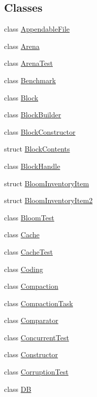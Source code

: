 \subsection*{Classes}
\begin{DoxyCompactItemize}
\item 
class \hyperlink{classleveldb_1_1_appendable_file}{Appendable\+File}
\item 
class \hyperlink{classleveldb_1_1_arena}{Arena}
\item 
class \hyperlink{classleveldb_1_1_arena_test}{Arena\+Test}
\item 
class \hyperlink{classleveldb_1_1_benchmark}{Benchmark}
\item 
class \hyperlink{classleveldb_1_1_block}{Block}
\item 
class \hyperlink{classleveldb_1_1_block_builder}{Block\+Builder}
\item 
class \hyperlink{classleveldb_1_1_block_constructor}{Block\+Constructor}
\item 
struct \hyperlink{structleveldb_1_1_block_contents}{Block\+Contents}
\item 
class \hyperlink{classleveldb_1_1_block_handle}{Block\+Handle}
\item 
struct \hyperlink{structleveldb_1_1_bloom_inventory_item}{Bloom\+Inventory\+Item}
\item 
struct \hyperlink{structleveldb_1_1_bloom_inventory_item2}{Bloom\+Inventory\+Item2}
\item 
class \hyperlink{classleveldb_1_1_bloom_test}{Bloom\+Test}
\item 
class \hyperlink{classleveldb_1_1_cache}{Cache}
\item 
class \hyperlink{classleveldb_1_1_cache_test}{Cache\+Test}
\item 
class \hyperlink{classleveldb_1_1_coding}{Coding}
\item 
class \hyperlink{classleveldb_1_1_compaction}{Compaction}
\item 
class \hyperlink{classleveldb_1_1_compaction_task}{Compaction\+Task}
\item 
class \hyperlink{structleveldb_1_1_comparator}{Comparator}
\item 
class \hyperlink{classleveldb_1_1_concurrent_test}{Concurrent\+Test}
\item 
class \hyperlink{classleveldb_1_1_constructor}{Constructor}
\item 
class \hyperlink{classleveldb_1_1_corruption_test}{Corruption\+Test}
\item 
class \hyperlink{classleveldb_1_1_d_b}{D\+B}

\end{DoxyCompactItemize}
